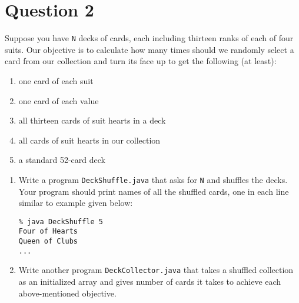 \section*{Question 2}
Suppose you have \texttt{N} decks of cards, each including thirteen ranks of each of four suits. Our objective is to calculate how many times should we randomly select a card from our collection and turn its face up to get the following (at least):
\begin{enumerate}[itemsep=0mm,label=(\alph*)]
\item one card of each suit
\item one card of each value
\item all thirteen cards of suit hearts in a deck
\item all cards of suit hearts in our collection
\item a standard 52-card deck
\end{enumerate}

\begin{enumerate}
\item Write a program \texttt{DeckShuffle.java} that asks for \texttt{N} and shuffles the decks. Your program should print names of all the shuffled cards, one in each line similar to example given below:
\begin{verbatim}
% java DeckShuffle 5
Four of Hearts
Queen of Clubs
...
\end{verbatim}
\item Write another program \texttt{DeckCollector.java} that takes a shuffled collection as an initialized array and gives number of cards it takes to achieve each above-mentioned objective.
\end{enumerate}

